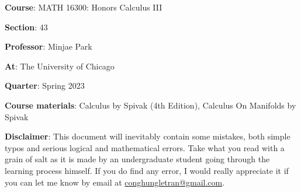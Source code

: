 \textbf{Course}: MATH 16300: Honors Calculus III

\textbf{Section}: 43

\textbf{Professor}: Minjae Park

\textbf{At}: The University of Chicago

\textbf{Quarter}: Spring 2023

\textbf{Course materials}: Calculus by Spivak (4th Edition), Calculus On Manifolds by Spivak

\vspace{1cm}
\textbf{Disclaimer}: This document will inevitably contain some mistakes, both simple typos and serious logical and mathematical errors. Take what you read with a grain of salt as it is made by an undergraduate student going through the learning process himself. If you do find any error, I would really appreciate it if you can let me know by email at \href{mailto:conghungletran@gmail.com}{conghungletran@gmail.com}.
